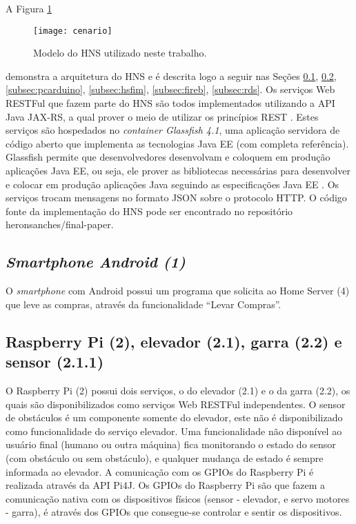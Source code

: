 A Figura \ref{fig:hnsworkmodel} 
\begin{figure}[!htb] \centering 
  \centering
  \texttt{[image: cenario]} 
  \caption{Modelo do HNS utilizado neste trabalho.} 
  \label{fig:hnsworkmodel}
\end{figure}
demonstra a arquitetura do HNS e é descrita logo a seguir nas Seções \ref{subsec:android}, \ref{subsec:rasp}, \ref{subsec:pcarduino}, \ref{subsec:hsfim}, \ref{subsec:fireb}, \ref {subsec:rds}. Os serviços Web RESTFul que fazem parte do HNS são todos implementados utilizando a API Java JAX-RS, a qual prover o meio de utilizar os princípios REST \cite{Heffelfinger:2014}. Estes serviços são hospedados no \textit{container Glassfish 4.1}, uma aplicação servidora de código aberto que implementa as tecnologias Java EE (com completa referência). Glassfish permite que desenvolvedores desenvolvam e coloquem em produção aplicações Java EE, ou seja, ele prover as bibliotecas necessárias para desenvolver e colocar em produção aplicações Java seguindo as especificações Java EE \cite{Heffelfinger:2014}. Os serviços trocam mensagens no formato JSON sobre o protocolo HTTP. O código fonte da implementação do HNS pode ser encontrado no repositório heronsanches/final-paper\footnotemark {}.

\subsection{\textit{Smartphone Android (1)}}
\label{subsec:android}
O \textit{smartphone} com Android\footnotemark {} possui um programa que solicita ao Home Server (4) que leve as compras, através da funcionalidade ``Levar Compras''.

\subsection{Raspberry Pi (2), elevador (2.1), garra (2.2) e sensor (2.1.1)}
\label{subsec:rasp}
O Raspberry Pi (2) possui dois serviços, o do elevador (2.1) e o da garra (2.2), os quais são disponibilizados como serviços Web RESTFul independentes. O sensor de obstáculos é um componente somente do elevador, este não é disponibilizado como funcionalidade do serviço elevador. Uma funcionalidade não disponível ao usuário final (humano ou outra máquina) fica monitorando o estado do sensor (com obstáculo ou sem obstáculo), e qualquer mudança de estado é sempre informada ao elevador. A comunicação com os GPIOs do Raspberry Pi é realizada através da API Pi4J\footnotemark {}. Os GPIOs do Raspberry Pi são que fazem a comunicação nativa com os dispositivos físicos (sensor - elevador, e servo motores - garra), é através dos GPIOs que consegue-se controlar e sentir os dispositivos.

